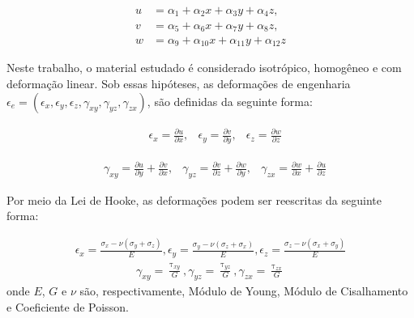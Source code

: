 \begin{equation}
\label{eqn:interpolation}
\begin{aligned}
u &= \alpha_{1} + \alpha_{2}x + \alpha_{3}y + \alpha_{4}z, \\
v &= \alpha_{5} + \alpha_{6}x + \alpha_{7}y + \alpha_{8}z, \\
w &= \alpha_{9} + \alpha_{10}x + \alpha_{11}y + \alpha_{12}z
\end{aligned}
\end{equation}

Neste trabalho, o material estudado é considerado isotrópico, homogêneo e com deformação linear. Sob essas hipóteses, as deformações de engenharia $\epsilon_{e} = (\epsilon_{x}, \epsilon_{y}, \epsilon_{z}, \gamma_{xy}, \gamma_{yz}, \gamma_{zx})$, são definidas da seguinte forma:

\begin{equation} \label{eq:axialdef}
    \begin{aligned}
    &\epsilon_{x} = \frac{\partial u}{\partial x}, 
    &\epsilon_{y} = \frac{\partial v}{\partial y}, 
    &\epsilon_{z} = \frac{\partial w}{\partial z}
    \end{aligned}
\end{equation}

\begin{equation} \label{eq:angulardef}
    \begin{aligned}
    &\gamma_{xy} = \frac{\partial u}{\partial y} + \frac{\partial v}{\partial x}, 
    &\gamma_{yz} = \frac{\partial v}{\partial z} + \frac{\partial w}{\partial y}, 
    &\gamma_{zx} = \frac{\partial w}{\partial x} + \frac{\partial u}{\partial z}
    \end{aligned}
\end{equation}

Por meio da Lei de Hooke, as deformações podem ser reescritas da seguinte forma:

\begin{equation} \label{eq:tensaodeformacao1}
    \begin{aligned}
        \epsilon_{x} = \frac{\sigma_{x} - \nu(\sigma_{y} + \sigma_{z})}{E},
        \epsilon_{y} = \frac{\sigma_{y} - \nu(\sigma_{z} + \sigma_{x})}{E},
        \epsilon_{z} = \frac{\sigma_{z} - \nu(\sigma_{x} + \sigma_{y})}{E}
    \end{aligned}    
\end{equation}
\begin{equation} \label{eq:tensaodeformacao2}
    \begin{aligned}
        \gamma_{xy} = \frac{\uptau_{xy}}{G},
        \gamma_{yz} = \frac{\uptau_{yz}}{G},
        \gamma_{zx} = \frac{\uptau_{zx}}{G}
    \end{aligned}
\end{equation}
onde $E$, $G$ e $\nu$ são, respectivamente, Módulo de Young, Módulo de Cisalhamento e Coeficiente de Poisson.

